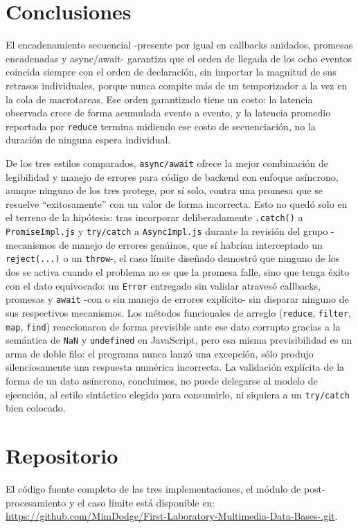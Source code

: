 \documentclass[conference,a4paper]{IEEEtran}
\begin{document}
\section{Conclusiones}
El encadenamiento secuencial -presente por igual en callbacks anidados, promesas encadenadas y async/await- garantiza que el orden de llegada de los ocho eventos coincida siempre con el orden de declaraci\'on, sin importar la magnitud de sus retrasos individuales, porque nunca compite m\'as de un temporizador a la vez en la cola de macrotareas. Ese orden garantizado tiene un costo: la latencia observada crece de forma acumulada evento a evento, y la latencia promedio reportada por \texttt{reduce} termina midiendo ese costo de secuenciaci\'on, no la duraci\'on de ninguna espera individual.

De los tres estilos comparados, \texttt{async/await} ofrece la mejor combinaci\'on de legibilidad y manejo de errores para c\'odigo de backend con enfoque as\'incrono, aunque ninguno de los tres protege, por s\'i solo, contra una promesa que se resuelve ``exitosamente'' con un valor de forma incorrecta. Esto no qued\'o solo en el terreno de la hip\'otesis: tras incorporar deliberadamente \texttt{.catch()} a \texttt{PromiseImpl.js} y \texttt{try/catch} a \texttt{AsyncImpl.js} durante la revisi\'on del grupo -mecanismos de manejo de errores gen\'uinos, que s\'i habr\'ian interceptado un \texttt{reject(...)} o un \texttt{throw}-, el caso l\'imite dise\~nado demostr\'o que ninguno de los dos se activa cuando el problema no es que la promesa falle, sino que tenga \'exito con el dato equivocado: un \texttt{Error} entregado sin validar atraves\'o callbacks, promesas y \texttt{await} -con o sin manejo de errores expl\'icito- sin disparar ninguno de sus respectivos mecanismos. Los m\'etodos funcionales de arreglo (\texttt{reduce}, \texttt{filter}, \texttt{map}, \texttt{find}) reaccionaron de forma previsible ante ese dato corrupto gracias a la sem\'antica de \texttt{NaN} y \texttt{undefined} en JavaScript, pero esa misma previsibilidad es un arma de doble filo: el programa nunca lanz\'o una excepci\'on, s\'olo produjo silenciosamente una respuesta num\'erica incorrecta. La validaci\'on expl\'icita de la forma de un dato as\'incrono, concluimos, no puede delegarse al modelo de ejecuci\'on, al estilo sint\'actico elegido para consumirlo, ni siquiera a un \texttt{try/catch} bien colocado.

\section*{Repositorio}
El c\'odigo fuente completo de las tres implementaciones, el m\'odulo de post-procesamiento y el caso l\'imite est\'a disponible en: \url{https://github.com/MimDodge/First-Laboratory-Multimedia-Data-Bases-.git}.
\end{document}
